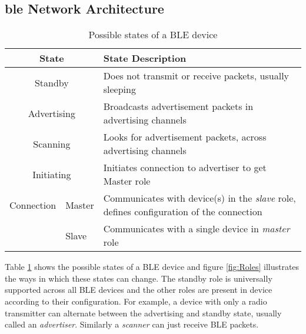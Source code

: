 \subsection[\texorpdfstring{\gls{ble}}{BLE} Network Architecture]{\texorpdfstring{\gls{ble}}{BLE} Network Architecture \cite{BLE101}}

\begin{table}[h]
\begin{center}
\vspace{-10pt}
\setlength{\extrarowheight}{1.5pt}
\begin{tabular}{|m{2.5cm}|m{1.2cm}|m{11.4cm}|}
\hline
\multicolumn{ 2}{|c|}{\textbf{State}} & \textbf{State Description} \\ \hline
\multicolumn{ 2}{|c|}{Standby} & Does not transmit or receive packets, usually sleeping \\ \hline
\multicolumn{ 2}{|c|}{Advertising} & Broadcasts advertisement packets in  advertising channels \\ \hline
\multicolumn{ 2}{|c|}{Scanning} & Looks for advertisement packets, across advertising channels \\ \hline
\multicolumn{ 2}{|c|}{Initiating} & Initiates connection to advertiser to get Master role \\ \hline
\multicolumn{ 1}{|m{2.0cm}|}{\hspace{42pt} \mbox{Connection}} & Master & Communicates with device(s) in the \emph{slave} role, defines configuration of the connection \\ \cline{ 2- 3}
\multicolumn{ 1}{|l|}{} & Slave & Communicates with a single device in \emph{master} role \\ \hline
\end{tabular}
\end{center}
\vspace{-12pt}
\caption{Possible states of a BLE device}
\vspace{-6pt}
\label{tbl:BLEstates}
\end{table}

Table \ref{tbl:BLEstates} shows the possible states of a BLE device and figure \ref{fig:Roles} illustrates the ways in which these states can change. The standby role is universally supported across all BLE devices and the other roles are present in device according to their configuration. For example, a device with only a radio transmitter can alternate between the advertising and standby state, usually called an \emph{advertiser}. Similarly a \emph{scanner} can just receive BLE packets.

